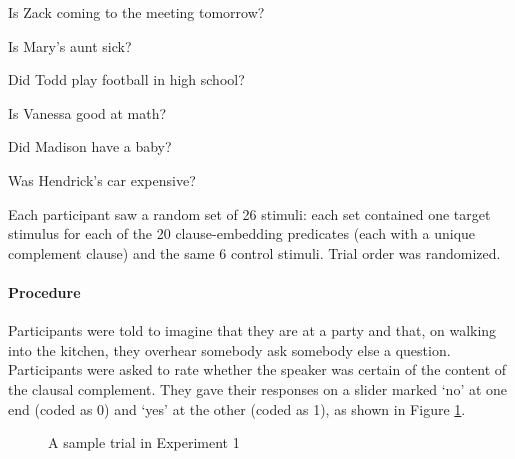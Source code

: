 \documentclass[11pt,fleqn]{article}
\newcommand{\6}{\mbox{$[\hspace*{-.6mm}[$}}
\newcommand{\9}{\mbox{$]\hspace*{-.6mm}]$}}
\begin{document}
\begin{exe}
\ex\label{control} 
\begin{xlist}

\ex   Is Zack coming to the meeting tomorrow?

\ex Is Mary's aunt sick?

\ex Did Todd play football in high school?

\ex Is Vanessa good at math?

\ex Did Madison have a baby?

\ex Was Hendrick's car expensive?

\end{xlist}
\end{exe}


Each participant saw a random set of 26 stimuli: each set contained one target stimulus for each of the 20 clause-embedding predicates (each with a unique complement clause) and the same 6 control stimuli. Trial order was randomized.

\paragraph{Procedure} Participants were told to imagine that they are at a party and that, on walking into the kitchen, they overhear somebody ask somebody else a question. Participants were asked to rate whether the speaker was certain of the content of the clausal complement. They gave their responses on a slider marked `no' at one end (coded as 0) and `yes' at the other (coded as 1), as shown in Figure \ref{fig-trial-exp1}.

\begin{figure}[h!]
\begin{center}
\end{center}
\caption{A sample trial in Experiment 1}\label{fig-trial-exp1}
\end{figure}
\end{document}

